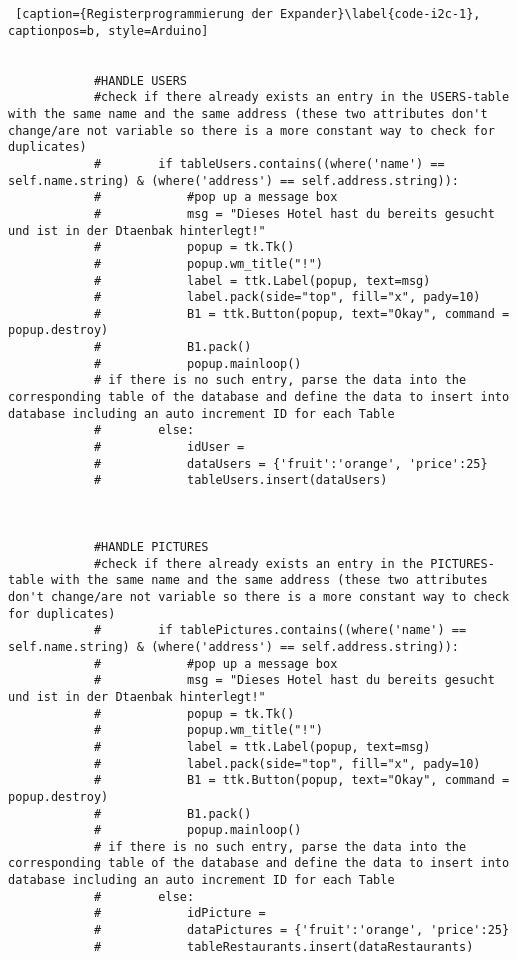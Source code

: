\documentclass[a4paper,oneside,12pt]{report}
\begin{document}
\begin{lstlisting} [caption={Registerprogrammierung der Expander}\label{code-i2c-1}, captionpos=b, style=Arduino]
			
			
			#HANDLE USERS
			#check if there already exists an entry in the USERS-table with the same name and the same address (these two attributes don't change/are not variable so there is a more constant way to check for duplicates)
			#        if tableUsers.contains((where('name') == self.name.string) & (where('address') == self.address.string)): 
			#            #pop up a message box
			#            msg = "Dieses Hotel hast du bereits gesucht und ist in der Dtaenbak hinterlegt!"
			#            popup = tk.Tk()
			#            popup.wm_title("!")
			#            label = ttk.Label(popup, text=msg)
			#            label.pack(side="top", fill="x", pady=10)
			#            B1 = ttk.Button(popup, text="Okay", command = popup.destroy)
			#            B1.pack()
			#            popup.mainloop()
			# if there is no such entry, parse the data into the corresponding table of the database and define the data to insert into database including an auto increment ID for each Table       
			#        else:
			#            idUser = 
			#            dataUsers = {'fruit':'orange', 'price':25}  
			#            tableUsers.insert(dataUsers)
			
			
			
			#HANDLE PICTURES
			#check if there already exists an entry in the PICTURES-table with the same name and the same address (these two attributes don't change/are not variable so there is a more constant way to check for duplicates)
			#        if tablePictures.contains((where('name') == self.name.string) & (where('address') == self.address.string)): 
			#            #pop up a message box
			#            msg = "Dieses Hotel hast du bereits gesucht und ist in der Dtaenbak hinterlegt!"
			#            popup = tk.Tk()
			#            popup.wm_title("!")
			#            label = ttk.Label(popup, text=msg)
			#            label.pack(side="top", fill="x", pady=10)
			#            B1 = ttk.Button(popup, text="Okay", command = popup.destroy)
			#            B1.pack()
			#            popup.mainloop()
			# if there is no such entry, parse the data into the corresponding table of the database and define the data to insert into database including an auto increment ID for each Table       
			#        else:
			#            idPicture =   
			#            dataPictures = {'fruit':'orange', 'price':25} 
			#            tableRestaurants.insert(dataRestaurants)
			
			
			

\end{lstlisting}
\end{document}
